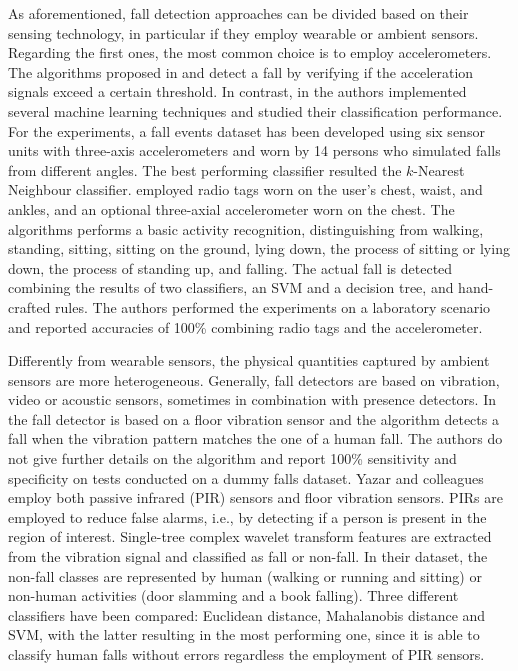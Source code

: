 As aforementioned, fall detection approaches can be divided based on their sensing technology, in particular if they employ wearable or ambient sensors. Regarding the first ones, the most common choice is to employ accelerometers. The algorithms proposed in \cite{Bourke2007} and \cite{Charlon2013} detect a fall by verifying if the acceleration signals exceed a certain threshold. In contrast, in \cite{Ozdemir2014} the authors implemented several machine learning techniques and studied their classification performance. For the experiments, a fall events dataset has been developed using six sensor units with three-axis accelerometers and worn by 14 persons who simulated falls from different angles. The best performing classifier resulted the $k$-Nearest Neighbour classifier. \cite{Lustrek2015} employed radio tags worn on the user's chest, waist, and ankles, and an optional three-axial accelerometer worn on the chest. The algorithms performs a basic activity recognition, distinguishing from walking, standing, sitting, sitting on the ground, lying down, the process of sitting or lying down, the process of standing up, and falling. The actual fall is detected combining the results of two classifiers, an SVM and a decision tree, and hand-crafted rules. The authors performed the experiments on a laboratory scenario and reported accuracies of 100\% combining radio tags and the accelerometer.


Differently from wearable sensors, the physical quantities captured by ambient sensors are more heterogeneous. Generally, fall detectors are based on vibration, video or acoustic sensors, sometimes in combination with presence detectors.  In \cite{alwan2006smart} the fall detector is based on a floor vibration sensor and the algorithm detects a fall when the vibration pattern matches the one of a human fall. The authors do not give further details on the algorithm and report 100\% sensitivity and specificity on tests conducted on a dummy falls dataset. Yazar and colleagues \cite{Yazar2013} employ both passive infrared (PIR) sensors and floor vibration sensors. PIRs are employed to reduce false alarms, i.e., by detecting if a person is present in the region of interest. Single-tree complex wavelet transform features are extracted from the vibration signal and classified as fall or non-fall. In their dataset, the non-fall classes are represented by human (walking or running and sitting) or non-human activities (door slamming and a book falling). Three different classifiers have been compared: Euclidean distance, Mahalanobis distance and SVM, with the latter resulting in the most performing one, since it is able to classify human falls without errors regardless the employment of PIR sensors.

